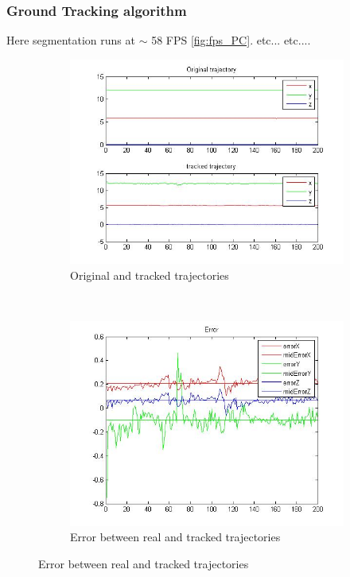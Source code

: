 	
	\subsubsection{Ground Tracking algorithm}
	Here segmentation runs at $\sim$ 58 FPS  \ref{fig:fps_PC}. etc... etc....
	
	
	\begin{figure}[ht]
		\centering
		\begin{subfigure}[ht]{0.45\linewidth}
			\centering
				\includegraphics[width=\linewidth]{../Images/c4/trajs}
				\caption{Original and tracked trajectories}
				\label{fig:trajectories_PC}
		\end{subfigure}
		~
		\begin{subfigure}[ht]{0.45\linewidth}
			\centering
			\includegraphics[width=\linewidth]{../Images/c4/errors}
			\caption{Error between real and tracked trajectories}
			\label{fig:errors_PC}
		\end{subfigure}
	\end{figure}
			
